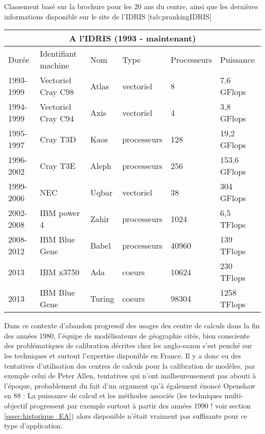 \begin{table}[!htbp]
\begin{sidecaption}[fortoc]{Classement basé sur la brochure pour les 20 ans du centre, ainsi que les dernières informations disponible sur le site de l'IDRIS}
	[tab:prankingIDRIS]
	\centering
	\begin{tabular}{@{}llllll@{}}
\toprule
\multicolumn{6}{c}{A l'IDRIS (1993 - maintenant)} \\ \midrule
Durée & Identifiant machine & Nom & Type & Processeurs & Puissance \\ \midrule
1993-1999 & Vectoriel Cray C98 & Atlas & vectoriel & 8 & 7,6 GFlops \\
1994-1999 & Vectoriel Cray C94 & Axis & vectoriel & 4 & 3,8 GFlops \\
1995-1997 & Cray T3D & Kaos & processeurs & 128 & 19,2 GFlops \\
1996-2002 & Cray T3E & Aleph & processeurs & 256 & 153,6 GFlops \\
1999-2006 & NEC & Uqbar & vectoriel & 38 & 304 GFlops \\
2002-2008 & IBM power 4 & Zahir & processeurs & 1024 & 6,5 TFlops \\
2008-2012 & IBM Blue Gene & Babel & processeurs & 40960 & 139 TFlops \\
2013 & IBM x3750 & Ada & coeurs & 10624 & 230 TFlops \\
2013 & IBM Blue Gene & Turing & coeurs & 98304 & 1258 TFlops \\ \bottomrule
\end{tabular}
\end{sidecaption}
\end{table}

Dans ce contexte d'abandon progressif des usages des centre de calculs dans la fin des années 1980, l'équipe de modélisateurs de géographie cités, bien consciente des problématiques de calibration décrites chez les anglo-saxon \autocite{Batty1976} s'est penché sur les techniques et surtout l'expertise disponible en France. Il y a donc eu des tentatives d'utilisation des centres de calculs pour la calibration de modèles, par exemple celui de Peter Allen, tentatives qui n'ont malheureusement pas abouti à l'époque, probablement du fait d'un argument qu'à également énoncé Openshaw en 88 : La puissance de calcul et les méthodes associés (les techniques multi-objectif progressent par exemple surtout à partir des années 1990 ! voir section \ref{sssec:historique_EA}) alors disponible n'était vraiment pas suffisante pour ce type d'application.

